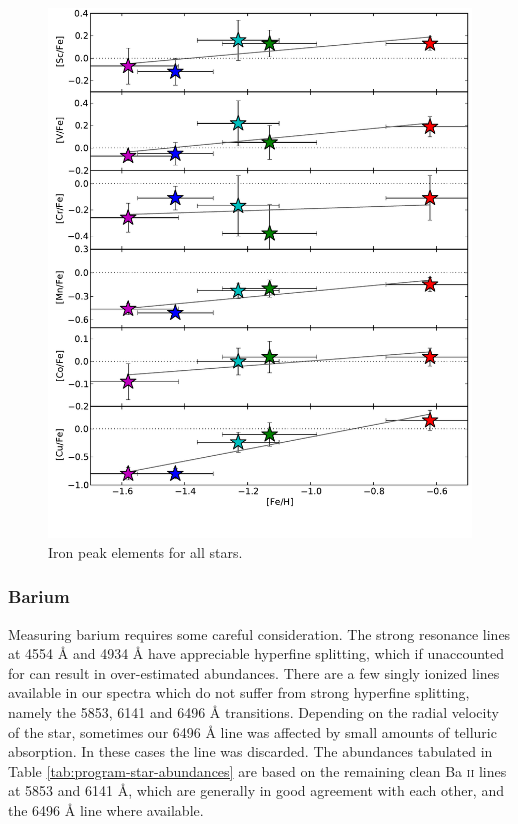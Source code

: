 \documentclass{emulateapj}
\begin{document}
\begin{figure}[h]
	\includegraphics[width=\columnwidth]{./figures/aquarius-fe-peak.pdf}
	\caption{Iron peak elements for all stars.}
	\label{fig:fe-peak-elements}
\end{figure}


\subsubsection{Barium}

Measuring barium requires some careful consideration. The strong resonance lines at 4554 {\AA} and 4934 {\AA} have appreciable hyperfine splitting, which if unaccounted for can result in over-estimated abundances. There are a few singly ionized lines available in our spectra which do not suffer from strong hyperfine splitting, namely the 5853, 6141 and 6496 {\AA} transitions. Depending on the radial velocity of the star, sometimes our 6496 {\AA} line was affected by small amounts of telluric absorption. In these cases the line was discarded. The abundances tabulated in Table \ref{tab:program-star-abundances} are based on the remaining clean Ba \textsc{ii} lines at 5853 and 6141 {\AA}, which are generally in good agreement with each other, and the 6496 {\AA} line where available.
\end{document}
